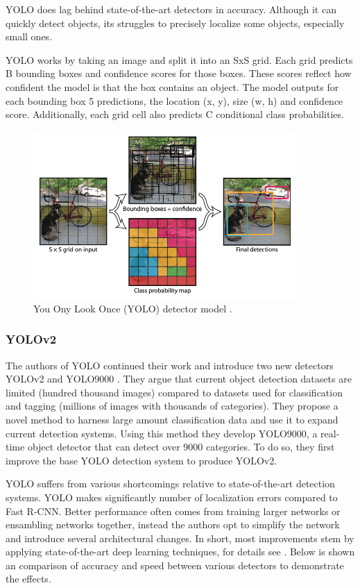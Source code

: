 YOLO does lag behind state-of-the-art detectors in accuracy. Although it can quickly detect objects, its struggles to precisely localize some objects, especially small ones. 

YOLO works by taking an image and split it into an SxS grid. Each grid predicts B bounding boxes and confidence scores for those boxes. These scores reflect how confident the model is that the box contains an object. The model outputs for each bounding box 5 predictions, the location (x, y), size (w, h) and confidence score. Additionally, each grid cell also predicts C conditional class probabilities. 

\begin{figure}[ht]
\begin{center}
\includegraphics[width=10cm,keepaspectratio]{images/2_literature/yolo.png}
\end{center}
\caption{You Ony Look Once (YOLO) detector model \cite{Redmon2016}.}
\end{figure}


\subsubsection{YOLOv2}
The authors of YOLO continued their work and introduce two new detectors YOLOv2 and YOLO9000 \cite{Redmon2017}. They argue that current object detection datasets are limited (hundred thousand images) compared to datasets used for classification and tagging (millions of images with thousands of categories). They propose a novel method to harness large amount classification data and use it to expand current detection systems. Using this method they develop YOLO9000, a real-time object detector that can detect over 9000 categories. To do so, they first improve the base YOLO detection system to produce YOLOv2. 

YOLO suffers from various shortcomings relative to state-of-the-art detection systems. YOLO makes significantly number of localization errors compared to Fast R-CNN. Better performance often comes from training larger networks or ensambling networks together, instead the authors opt to simplify the network and introduce several architectural changes. In short, most improvements stem by applying state-of-the-art deep learning techniques, for details see \cite{Redmon2017}.  Below is shown an comparison of accuracy and speed between various detectors to demonstrate the effects.


